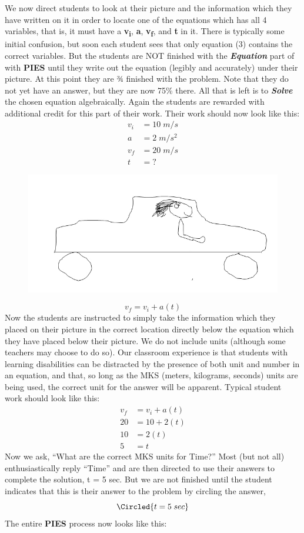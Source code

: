 \documentclass[11.5pt]{sig-alternate} %
\begin{document}
\begin{large}
We now direct students to look at their picture and the information which they have written on it in order to locate one of the equations which has all 4 variables, that is, it must have a \textbf{v\textsubscript{i}}, \textbf{a}, \textbf{v\textsubscript{f}}, and \textbf{t} in it.  There is typically some initial confusion, but soon each student sees that only equation (3) contains the correct variables.  But the students are NOT finished with the \textbf{\textit{Equation}} part of with \textbf{PIES} until they write out the equation (legibly and accurately) under their picture.  At this point they are ¾ finished with the problem. Note that they do not yet have an answer, but they are now 75\% there. All that is left is to \textbf{\textit{Solve}} the chosen equation algebraically.  Again the students are rewarded with additional credit for this part of their work. Their work should now look like this:
\begin{align*}
    v_{i} &= 10\;m/s \\
    a &= 2\;m/s^{2} \\
    v_{f} &= 20\;m/s \\
    t &= ?
\end{align*}
\begin{figure}[!h]
    \centering
    \includegraphics[width=1\linewidth]{img1.jpg}
\end{figure}
\[v_{f} = v_{i} + a (t)\]
Now the students are instructed to simply take the information which they placed on their picture in the correct location directly below the equation which they have placed below their picture. We do not include units (although some teachers may choose to do so).  Our classroom experience is that students with learning disabilities can be distracted by the presence of both unit and number in an equation, and that, so long as the MKS (meters, kilograms, seconds) units are being used, the correct unit for the answer will be apparent. Typical student work should look like this:
\begin{align*}
    v_{f} &= v_{i} + a (t) \\
    20 &= 10 + 2 (t) \\
    10 &= 2 (t) \\
    5 &= t
\end{align*}
Now we ask, “What are the correct MKS units for Time?”  Most (but not all) enthusiastically reply “Time” and are then directed to use their answers to complete the solution,  t  = 5  sec. But we are not finished until the student indicates that this is their answer to the problem by circling the answer,
\[\Circled{t = 5\;sec}\]
The entire \textbf{PIES} process now looks like this:


\end{large}
\end{document}
